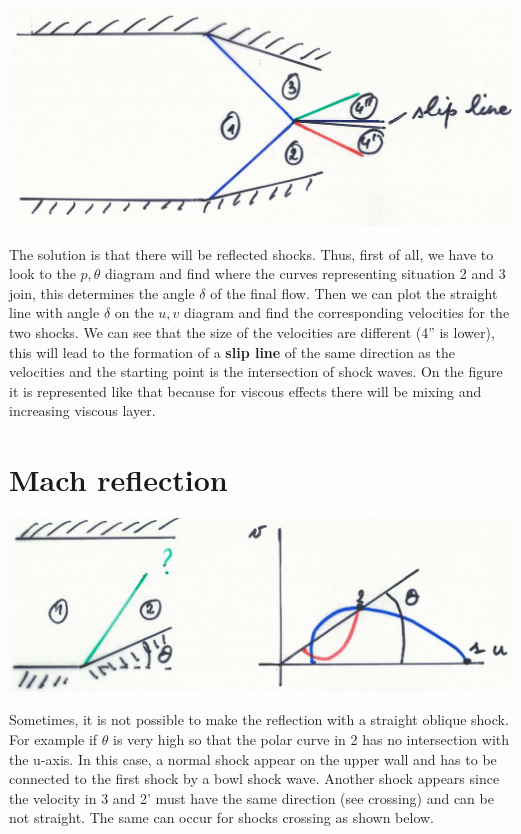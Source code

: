 \begin{center}
\begin{minipage}{0.35\textwidth}
\end{minipage}
\begin{minipage}{0.25\textwidth}
\includegraphics[scale=0.1]{ch9/12}
\end{minipage}
\end{center}

The solution is that there will be reflected shocks. Thus, first of all, we have to look to the $p,\theta$ diagram and find where the curves representing situation 2 and 3 join, this determines the angle $\delta$ of the final flow. Then we can plot the straight line with angle $\delta$ on the $u,v$ diagram and find the corresponding velocities for the two shocks. We can see that the size of the velocities are different (4'' is lower), this will lead to the formation of a \textbf{slip line} of the same direction as the velocities and the starting point is the intersection of shock waves. On the figure it is represented like that because for viscous effects there will be mixing and increasing viscous layer.  

\section{Mach reflection}
\begin{center}
\includegraphics[scale=0.1]{ch9/13}
\end{center}

Sometimes, it is not possible to make the reflection with a straight oblique shock. For example if $\theta$ is very high so that the polar curve in 2 has no intersection with the u-axis. In this case, a normal shock appear on the upper wall and has to be connected to the first shock by a bowl shock wave. Another shock appears since the velocity in 3 and 2' must have the same direction (see crossing) and can be not straight. The same can occur for shocks crossing as shown below.

